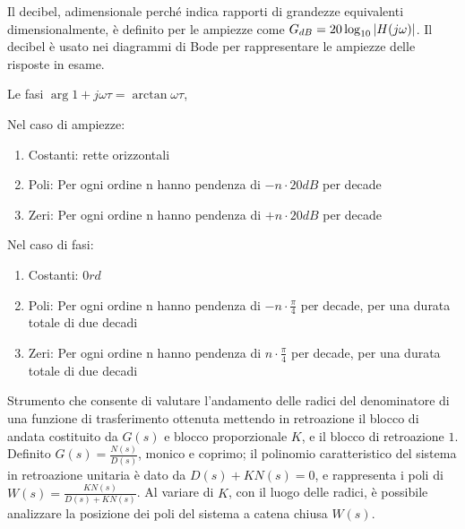 Il decibel, adimensionale perché indica rapporti di grandezze equivalenti dimensionalmente, è definito per le ampiezze come $G_{dB} = 20\log_{10}{\left|H(j\omega)\right|}$. Il decibel è usato nei diagrammi di Bode per rappresentare le ampiezze delle risposte in esame.

Le fasi $\arg{1+j\omega \tau}=\arctan{\omega \tau}$, 

Nel caso di ampiezze:
\begin{enumerate}
    \item Costanti: rette orizzontali
    \item Poli: Per ogni ordine n hanno pendenza di $-n\cdot 20dB$ per decade 
    \item Zeri: Per ogni ordine n hanno pendenza di $+n\cdot 20dB$ per decade
\end{enumerate}

Nel caso di fasi:
\begin{enumerate}
    \item Costanti: $0 rd$
    \item Poli: Per ogni ordine n hanno pendenza di $-n\cdot \frac{\pi}{4}$ per decade, per una durata totale di due decadi
    \item Zeri: Per ogni ordine n hanno pendenza di $n\cdot \frac{\pi}{4}$ per decade, per una durata totale di due decadi
\end{enumerate}

Strumento che consente di valutare l'andamento delle radici del denominatore di una funzione di trasferimento ottenuta mettendo in retroazione il blocco di andata costituito da $G(s)$ e blocco proporzionale $K$, e il blocco di retroazione $1$. 
Definito $G(s)=\frac{N(s)}{D(s)}$, monico e coprimo; il polinomio caratteristico del sistema in retroazione unitaria è dato da $D(s) + K N(s) = 0$, e rappresenta i poli di $W(s)=\frac{K N(s)}{D(s) + K N(s)}$. Al variare di $K$, con il luogo delle radici, è possibile analizzare la posizione dei poli del sistema a catena chiusa $W(s)$.

